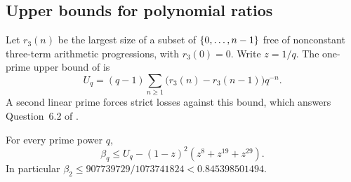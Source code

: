 \subsection{Upper bounds for polynomial ratios}\label{gpp:sec:upper}
{\raggedright{}}

Let $r_3(n)$ be the largest size of a subset of $\{0,\ldots,n-1\}$ free of nonconstant
three-term arithmetic progressions, with $r_3(0)=0$. Write $z=1/q$. The one-prime upper
bound of \cite{Asada2017Subsets} is
\[
 U_q=(q-1)\sum_{n\ge1}\bigl(r_3(n)-r_3(n-1)\bigr)q^{-n}.
\]
A second linear prime forces strict losses against this bound, which answers
Question~6.2 of \cite{Asada2017Subsets}.

\begin{theorem}\label{gpp:thm:twoprime}
For every prime power $q$,
\[
 \beta_q\le U_q-(1-z)^2(z^8+z^{19}+z^{29}).
\]
In particular $\beta_2\le907739729/1073741824<0.845398501494$.
\end{theorem}

